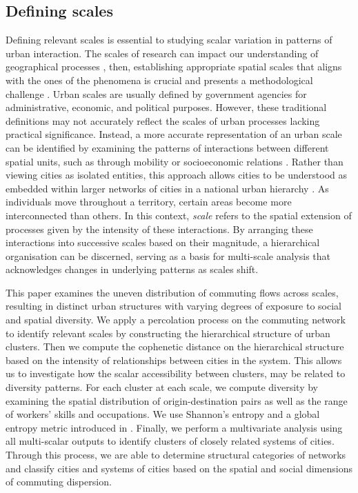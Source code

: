\documentclass[11pt, a4paper]{article}
\begin{document}
\subsection{Defining scales}

Defining relevant scales is essential to studying scalar variation in patterns of urban interaction. The scales of research can impact our understanding of geographical processes \citep{Jonas2011,Rozenblat2013Conclusion}, then, establishing appropriate spatial scales that aligns with the ones of the phenomena is crucial and presents a methodological challenge \citep{Montello2001, Allen2014, Walz2015}. Urban scales are usually defined by government agencies for administrative, economic, and political purposes. However, these traditional definitions may not accurately reflect the scales of urban processes lacking practical significance. Instead, a more accurate representation of an urban scale can be identified by examining the patterns of interactions between different spatial units, such as through mobility or socioeconomic relations \citep{Fusco2011,Yin2017}. Rather than viewing cities as isolated entities, this approach allows cities to be understood as embedded within larger networks of cities in a national urban hierarchy \citep{batty1994fractal,Bretagnolle2006}. As individuals move throughout a territory, certain areas become more interconnected than others. In this context, \emph{scale} refers to the spatial extension of processes given by the intensity of these interactions. By arranging these interactions into successive scales based on their magnitude, a hierarchical organisation can be discerned, serving as a basis for multi-scale analysis that acknowledges changes in underlying patterns as scales shift.

This paper examines the uneven distribution of commuting flows across scales, resulting in distinct urban structures with varying degrees of exposure to social and spatial diversity. We apply a percolation process on the commuting network to identify relevant scales by constructing the hierarchical structure of urban clusters. Then we compute the cophenetic distance on the hierarchical structure based on the intensity of relationships between cities in the system. This allows us to investigate how the scalar accessibility between clusters, may be related to diversity patterns. For each cluster at each scale, we compute diversity by examining the spatial distribution of origin-destination pairs as well as the range of  workers' skills and occupations. We use Shannon's entropy and a global entropy metric introduced in \citep{Marin2022}. Finally, we perform a multivariate analysis using all multi-scalar outputs to identify clusters of closely related systems of cities. Through this process, we are able to determine structural categories of networks and classify cities and systems of cities based on the spatial and social dimensions of commuting dispersion.
\end{document}
